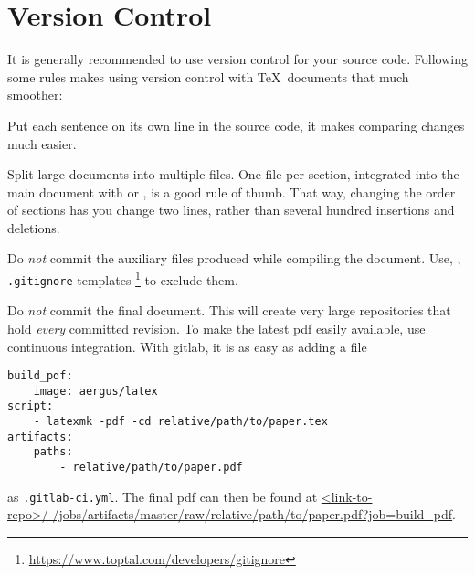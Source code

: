 \section{Version Control}\label{sec:versioncontrol}
It is generally recommended to use version control for your source code.
Following some rules makes using version control with \TeX\ documents that much smoother:

Put each sentence on its own line in the source code, it makes comparing changes much easier.

Split large documents into multiple files.
One file per section, integrated into the main document with \verb|| or \verb||, is a good rule of thumb.
That way, changing the order of sections has you change two lines, rather than several hundred insertions and deletions.

Do \emph{not} commit the auxiliary files produced while compiling the document.
Use, \eg, \verb|.gitignore| templates%
\footnote{\url{https://www.toptal.com/developers/gitignore}}
to exclude them.

Do \emph{not} commit the final document.
This will create very large repositories that hold \emph{every} committed revision.
To make the latest pdf easily available, use continuous integration.
With gitlab, it is as easy as adding a file
\begin{Verbatim}[tabsize=4]
build_pdf:
	image: aergus/latex
script:
	- latexmk -pdf -cd relative/path/to/paper.tex
artifacts:
	paths:
		- relative/path/to/paper.pdf
\end{Verbatim}
as \verb|.gitlab-ci.yml|.
The final pdf can then be found at \url{<link-to-repo>/-/jobs/artifacts/master/raw/relative/path/to/paper.pdf?job=build_pdf}.